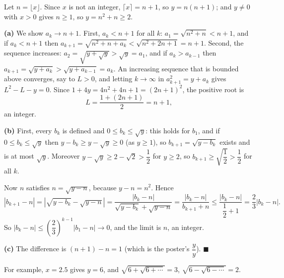 Let $n=\lfloor x\rfloor$. Since $x$ is not an integer, $\lceil x\rceil=n+1$, so $y=n(n+1)$; and $y\ne0$ with $x>0$ gives $n\ge1$, so $y=n^2+n\ge2$.

\textbf{(a)} We show $a_k\to n+1$. First, $a_k<n+1$ for all $k$: $a_1=\sqrt{n^2+n}<n+1$, and if $a_k<n+1$ then $a_{k+1}=\sqrt{n^2+n+a_k}<\sqrt{n^2+2n+1}=n+1$. Second, the sequence increases: $a_2=\sqrt{y+\sqrt y}>\sqrt y=a_1$, and if $a_k>a_{k-1}$ then $a_{k+1}=\sqrt{y+a_k}>\sqrt{y+a_{k-1}}=a_k$. An increasing sequence that is bounded above converges, say to $L>0$, and letting $k\to\infty$ in $a_{k+1}^2=y+a_k$ gives $L^2-L-y=0$. Since $1+4y=4n^2+4n+1=(2n+1)^2$, the positive root is
\[L=\dfrac{1+(2n+1)}{2}=n+1,\]
an integer.

\textbf{(b)} First, every $b_k$ is defined and $0\le b_k\le\sqrt y$: this holds for $b_1$, and if $0\le b_k\le\sqrt y$ then $y-b_k\ge y-\sqrt y\ge0$ (as $y\ge1$), so $b_{k+1}=\sqrt{y-b_k}$ exists and is at most $\sqrt y$. Moreover $y-\sqrt y\ge2-\sqrt2>\dfrac{1}{2}$ for $y\ge2$, so $b_{k+1}\ge\sqrt{\dfrac{1}{2}}>\dfrac{1}{2}$ for all $k$.

Now $n$ satisfies $n=\sqrt{y-n}$, because $y-n=n^2$. Hence
\[\left|b_{k+1}-n\right|=\left|\sqrt{y-b_k}-\sqrt{y-n}\right|=\dfrac{\left|b_k-n\right|}{\sqrt{y-b_k}+\sqrt{y-n}}=\dfrac{\left|b_k-n\right|}{b_{k+1}+n}\le\dfrac{\left|b_k-n\right|}{\dfrac{1}{2}+1}=\dfrac{2}{3}\left|b_k-n\right|.\]
So $\left|b_k-n\right|\le\left(\dfrac{2}{3}\right)^{k-1}\left|b_1-n\right|\to0$, and the limit is $n$, an integer.

\textbf{(c)} The difference is $(n+1)-n=\boxed{1}$ (which is the poster's $\dfrac {y}{y}$). $\blacksquare$

For example, $x=2.5$ gives $y=6$, and $\sqrt{6+\sqrt{6+\cdots}}=3$, $\sqrt{6-\sqrt{6-\cdots}}=2$.
